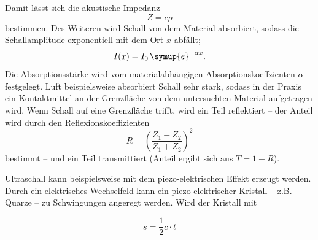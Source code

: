 Damit lässt sich die akustische Impedanz
\begin{equation}
	Z=c \rho
\end{equation}
bestimmen.
Des Weiteren wird Schall von dem Material absorbiert, sodass die Schallamplitude exponentiell
mit dem Ort $x$ abfällt;
\begin{equation}
	\label{eqn:dampf}
	I(x) = I_0 \, \symup{e}^{-\alpha x} \mathrm{.}
\end{equation}
Die Absorptionsstärke wird vom materialabhängigen Absorptionskoeffzienten $\alpha$ festgelegt.
Luft beispielsweise absorbiert Schall sehr stark, sodass in der Praxis ein Kontaktmittel an der
Grenzfläche von dem untersuchten Material aufgetragen wird.
Wenn Schall auf eine Grenzfläche trifft, wird ein Teil reflektiert -- der Anteil wird durch den
Reflexionskoeffizienten
\begin{equation}
	R =(\frac{Z_1-Z_2}{Z_1+Z_2})^2
\end{equation}
bestimmt -- und ein Teil transmittiert (Anteil ergibt sich aus $T=1-R$).

Ultraschall kann beispielsweise mit dem piezo-elektrischen Effekt erzeugt werden.
Durch ein elektrisches Wechselfeld kann ein piezo-elektrischer Kristall -- z.B. Quarze -- zu
Schwingungen angeregt werden. Wird der Kristall mit



\begin{equation}
	\label{eqn:laufzeit}
	s=\frac{1}{2}c\cdot t
\end{equation}
